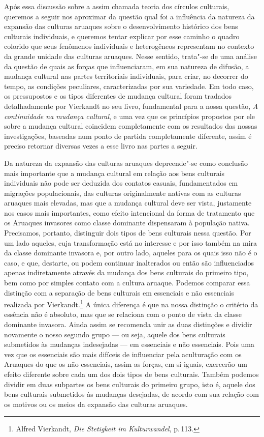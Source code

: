 Após essa discussão sobre a assim chamada teoria dos círculos
culturais, queremos a seguir nos aproximar da questão qual foi a
influência da natureza da expansão das culturas aruaques sobre o
desenvolvimento histórico dos bens culturais individuais, e queremos
tentar explicar por esse caminho o quadro colorido que seus fenômenos
individuais e heterogêneos representam no contexto da grande unidade
das culturas aruaques. Nesse sentido, trata"-se de uma análise da questão
de quais as forças que influenciaram, em sua natureza de difusão, a
mudança cultural nas partes territoriais individuais, para criar, no
decorrer do tempo, as condições peculiares, caracterizadas por sua
variedade. Em todo caso, os pressupostos e os tipos diferentes de
mudança cultural foram tradados detalhadamente por Vierkandt no seu
livro, fundamental para a nossa questão, \textit{A continuidade na mudança cultural}, 
e uma vez que
os princípios propostos por ele sobre a mudança cultural coincidem
completamente com os resultados das nossas investigações, baseadas num
ponto de partida completamente diferente, assim é preciso retornar
diversas vezes a esse livro nas partes a seguir.

Da natureza da expansão das culturas aruaques depreende"-se como
conclusão mais importante que a mudança cultural em relação aos bens
culturais individuais não pode ser deduzida dos contatos casuais,
fundamentados em migrações populacionais, das culturas originalmente
nativas com as culturas aruaques mais elevadas, mas que a mudança
cultural deve ser vista, justamente nos casos mais importantes, como
efeito intencional da forma de tratamento que os Aruaques invasores como
classe dominante dispensaram à população nativa. Precisamos, portanto,
distinguir dois tipos de bens culturais nessa questão. Por um lado
aqueles, cuja transformação está no interesse e por isso também na mira
da classe dominante invasora e, por outro lado, aqueles para os quais
isso não é o caso, e que, destarte, ou podem continuar inalterados ou
então são influenciados apenas indiretamente através da mudança dos bens
culturais do primeiro tipo, bem como por simples contato com a cultura
aruaque. Podemos comparar essa distinção com a separação de bens
culturais em essenciais e não essenciais realizada por
Vierkandt.\footnote{Alfred Vierkandt, \textit{Die Stetigkeit im
  Kulturwandel}, p.\,113.} A única diferença é que na nossa distinção o
critério da essência não é absoluto, mas que se relaciona com o ponto de
vista da classe dominante invasora. Ainda assim se recomenda unir as
duas distinções e dividir novamente o nosso segundo grupo --- ou seja,
aquele dos bens culturais submetidos às mudanças indesejadas --- em
essenciais e não essenciais. Pois uma vez que os essenciais são mais
difíceis de influenciar pela aculturação com os Aruaques do que os
não essenciais, assim as forças, em si iguais, exercerão um efeito
diferente sobre cada um dos dois tipos de bens culturais. Também podemos
dividir em duas subpartes os bens culturais do primeiro grupo, isto é,
aquele dos bens culturais submetidos às mudanças desejadas, de acordo
com sua relação com os motivos ou os meios da expansão das culturas
aruaques.

